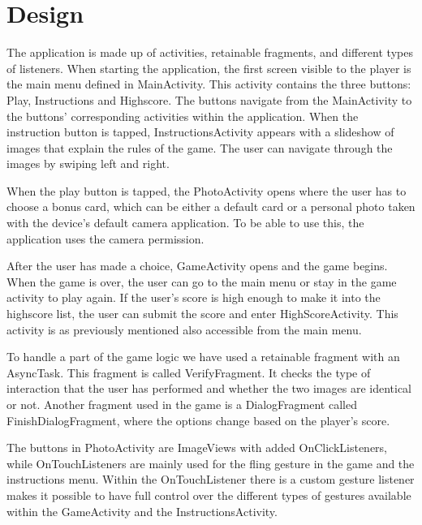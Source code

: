 \section{Design}
The application is made up of activities, retainable fragments, and different types of listeners. When starting the application, the first screen visible to the player is the main menu defined in MainActivity. This activity contains the three buttons: Play, Instructions and Highscore. The buttons navigate from the MainActivity to the buttons’ corresponding activities within the application. When the instruction button is tapped, InstructionsActivity appears with a slideshow of images that explain the rules of the game. The user can navigate through the images by swiping left and right.  \newline

When the play button is tapped, the PhotoActivity opens where the user has to choose a bonus card, which can be either a default card or a personal photo taken with the device’s default camera application. To be able to use this, the application uses the camera permission. \newline

After the user has made a choice, GameActivity opens and the game begins. When the game is over, the user can go to the main menu or stay in the game activity to play again. If the user’s score is high enough to make it into the highscore list, the user can submit the score and enter HighScoreActivity. This activity is as previously mentioned also accessible from the main menu. \newline

To handle a part of the game logic we have used a retainable fragment with an AsyncTask. This fragment is called VerifyFragment. It checks the type of interaction that the user has performed and whether the two images are identical or not. Another fragment used in the game is a DialogFragment called FinishDialogFragment, where the options change based on the player’s score. \newline

The buttons in PhotoActivity are ImageViews with added OnClickListeners, while OnTouchListeners are mainly used for the fling gesture in the game and the instructions menu. Within the OnTouchListener there is a custom gesture listener makes it possible to have full control over the different types of gestures available within the GameActivity and the InstructionsActivity.